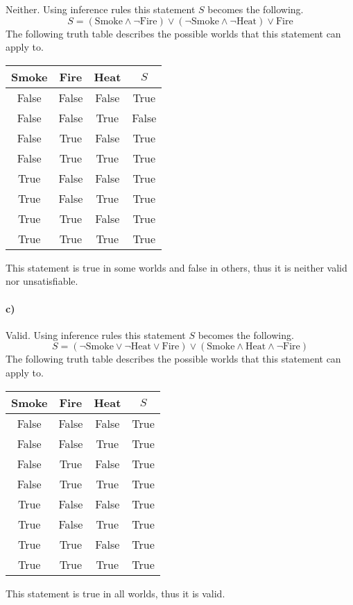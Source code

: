 \documentclass[12pt]{article}
\begin{document}
Neither. Using inference rules this statement \(S\) becomes the following.
\[S=(\text{Smoke}\land\neg\text{Fire})\lor (\neg\text{Smoke}\land\neg\text{Heat}) \lor \text{Fire}\]
The following truth table describes the possible worlds that this statement can apply to.
\begin{center}
        \begin{tabular}{c|c|c|c}
                Smoke & Fire & Heat & \(S\)\\
                \hline
                False & False & False & True\\
                False & False & True & False\\
                False & True & False & True\\
                False & True & True & True\\
                True & False & False & True\\
                True & False & True & True\\
                True & True & False & True\\
                True & True & True & True
        \end{tabular}
\end{center}
This statement is true in some worlds and false in others, thus it is neither valid nor unsatisfiable.

\paragraph{c)}

Valid. Using inference rules this statement \(S\) becomes the following.
\[S=(\neg\text{Smoke}\lor\neg\text{Heat}\lor\text{Fire})\lor(\text{Smoke}\land\text{Heat}\land\neg\text{Fire})\]
The following truth table describes the possible worlds that this statement can apply to.
\begin{center}
        \begin{tabular}{c|c|c|c}
                Smoke & Fire & Heat & \(S\)\\
                \hline
                False & False & False & True\\
                False & False & True & True\\
                False & True & False & True\\
                False & True & True & True\\
                True & False & False & True\\
                True & False & True & True\\
                True & True & False & True\\
                True & True & True & True
        \end{tabular}
\end{center}
This statement is true in all worlds, thus it is valid.
\end{document}
